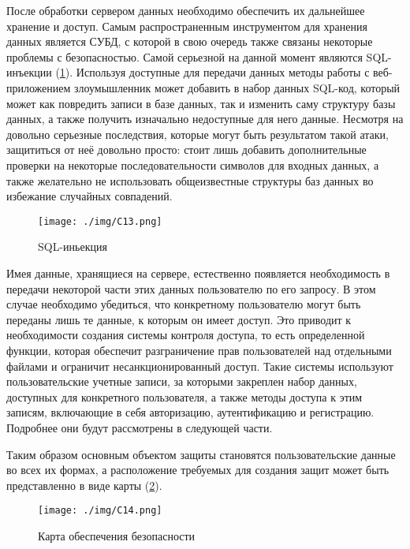 После обработки сервером данных необходимо обеспечить их дальнейшее хранение и доступ. Самым распространенным инструментом для хранения данных является СУБД, с которой в свою очередь также связаны некоторые проблемы с безопасностью. Самой серьезной на данной момент являются SQL-инъекции (\ref{pic:C13}). Используя доступные для передачи данных методы работы с веб-приложением злоумышленник может добавить в набор данных SQL-код, который может как повредить записи в базе данных, так и изменить саму структуру базы данных, а также получить изначально недоступные для него данные. Несмотря на довольно серьезные последствия, которые могут быть результатом такой атаки, защититься от неё довольно просто: стоит лишь добавить дополнительные проверки на некоторые последовательности символов для входных данных, а также желательно не использовать общеизвестные структуры баз данных во избежание случайных совпадений.

\begin{figure}

\begin{center}

\texttt{[image: ./img/C13.png]}

\end{center}

\caption{SQL-иньекция}

\label{pic:C13}

\end{figure}

Имея данные, хранящиеся на сервере, естественно появляется необходимость в передачи некоторой части этих данных пользователю по его запросу. В этом случае необходимо убедиться, что конкретному пользователю могут быть переданы лишь те данные, к которым он имеет доступ. Это приводит к необходимости создания системы контроля доступа, то есть определенной функции, которая обеспечит разграничение прав пользователей над отдельными файлами и ограничит несанкционированный доступ. Такие системы используют пользовательские учетные записи, за которыми закреплен набор данных, доступных для конкретного пользователя, а также методы доступа к этим записям, включающие в себя авторизацию, аутентификацию и регистрацию. Подробнее они будут рассмотрены в следующей части.

Таким образом основным объектом защиты становятся пользовательские данные во всех их формах, а расположение требуемых для создания защит может быть представленно в виде карты (\ref{pic:C14}).

\begin{figure}

\begin{center}

\texttt{[image: ./img/C14.png]}

\end{center}

\caption{Карта обеспечения безопасности}

\label{pic:C14}

\end{figure}

